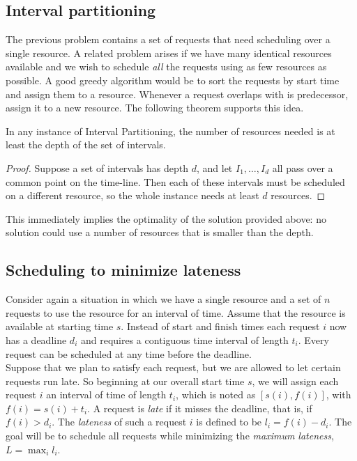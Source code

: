 \documentclass[]{article}
\begin{document}
	\subsection{Interval partitioning}
		The previous problem contains a set of requests that need scheduling over a single resource. A related problem arises if we have many identical resources available and we wish to schedule \emph{all} the requests using as few resources as possible. A good greedy algorithm would be to sort the requests by start time and assign them to a resource. Whenever a request overlaps with is predecessor, assign it to a new resource. The following theorem supports this idea.
        \begin{theorem}In any instance of Interval Partitioning, the number of resources needed is at least the depth of the set of intervals.  \end{theorem}
        \begin{proof}
        	Suppose a set of intervals has depth $d$, and let $I_1,\dots,I_d$ all pass over a common point on the time-line. Then each of these intervals must be scheduled on a different resource, so the whole instance needs at least $d$ resources.
        \end{proof}
        This immediately implies the optimality of the solution provided above: no solution could use a number of resources that is smaller than the depth. 
	\subsection{Scheduling to minimize lateness}
    	Consider again a situation in which we have a single resource and a set of $n$ requests to use the resource for an interval of time. Assume that the resource is available at starting time $s$. Instead of start and finish times each request $i$ now has a deadline $d_i$ and requires a contiguous time interval of length $t_i$. Every request can be scheduled at any time before the deadline. \\
		
		Suppose that we plan to satisfy each request, but we are allowed to let certain requests run late. So beginning at our overall start time $s$, we will assign each request $i$ an interval of time of length $t_i$, which is noted as $\left[s(i),f(i)\right]$, with $f(i) = s(i) + t_i$. A request is \emph{late} if it misses the deadline, that is, if $f(i) > d_i$. The \emph{lateness} of such a request $i$ is defined to be $l_i = f(i) - d_i$. The goal will be to schedule all requests while minimizing the \emph{maximum lateness}, $L = \max_i l_i$.
		
\end{document}
